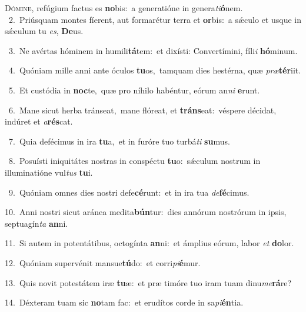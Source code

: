 \lettrine{\initial\textcolor{\initialcolor}{D}}{ómine,} refúgium factus es \textbf{no}\-bis:~\star a generatióne in genera\-\textit{ti}\-\textbf{ó}nem.\\
{\numbfont\textcolor{\numbcolor}{~2.}}~Priúsquam montes fíerent, aut formarétur terra et \textbf{or}\-bis:~\star a sǽculo et usque in sǽculum tu \textit{es}\-, \textbf{De}\-us.\par
{\numbfont\textcolor{\numbcolor}{~3.}}~Ne avértas hóminem in humili\-\textbf{tá}\-tem:~\star et dixísti: Convertímini, fíli\textit{i} \textbf{hó}\-minum.\par
{\numbfont\textcolor{\numbcolor}{~4.}}~Quóniam mille anni ante óculos \textbf{tu}\-os,~\star tamquam dies hestérna, quæ \textit{præ}\-\textbf{tér}iit.\par
{\numbfont\textcolor{\numbcolor}{~5.}}~Et custódia in \textbf{noc}\-te,~\star quæ pro níhilo habéntur, eórum an\textit{ni} \textbf{e}\-runt.\par
{\numbfont\textcolor{\numbcolor}{~6.}}~Mane sicut herba tránseat,~\dagger mane flóreat, et \textbf{tráns}\-eat:~\star véspere décidat, indúret et \textit{a}\-\textbf{rés}cat.\par
{\numbfont\textcolor{\numbcolor}{~7.}}~Quia defécimus in ira \textbf{tu}\-a,~\star et in furóre tuo turbá\textit{ti} \textbf{su}\-mus.\par
{\numbfont\textcolor{\numbcolor}{~8.}}~Posuísti iniquitátes nostras in conspéctu \textbf{tu}\-o:~\star sǽculum nostrum in illuminatióne vul\textit{tus} \textbf{tu}\-i.\par
{\numbfont\textcolor{\numbcolor}{~9.}}~Quóniam omnes dies nostri defe\-\textbf{cé}\-runt:~\star et in ira tua \textit{de}\-\textbf{fé}cimus.\par
{\numbfont\textcolor{\numbcolor}{10.}}~Anni nostri sicut aránea medita\-\textbf{bún}\-tur:~\star dies annórum nostrórum in ipsis, septuagín\textit{ta} \textbf{an}\-ni.\par
{\numbfont\textcolor{\numbcolor}{11.}}~Si autem in potentátibus, octogínta \textbf{an}\-ni:~\star et ámplius eórum, labor \textit{et} \textbf{do}\-lor.\par
{\numbfont\textcolor{\numbcolor}{12.}}~Quóniam supervénit mansue\-\textbf{tú}\-do:~\star et corri\-\textit{pi}\-\textbf{é}mur.\par
{\numbfont\textcolor{\numbcolor}{13.}}~Quis novit potestátem iræ \textbf{tu}\-æ:~\star et præ timóre tuo iram tuam dinu\-\textit{me}\-\textbf{rá}re?\par
{\numbfont\textcolor{\numbcolor}{14.}}~Déxteram tuam sic \textbf{no}\-tam fac:~\star et erudítos corde in sa\-\textit{pi}\-\textbf{én}tia.\par
